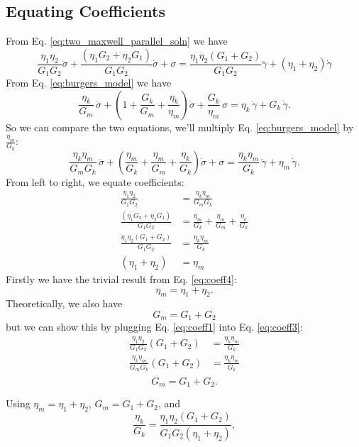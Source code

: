 \documentclass[12pt, a4paper]{article}
\numberwithin{equation}{section}
\begin{document}
\subsection{Equating Coefficients}
From Eq. \ref{eq:two_maxwell_parallel_soln} we have
\[
	\frac{\eta_1\eta_2}{G_1G_2} \ddot\sigma
	+ \frac{(\eta_1 G_2 + \eta_2 G_1)}{G_1G_2} \dot\sigma
	+ \sigma
		= \frac{\eta_1\eta_2(G_1 + G_2)}{G_1G_2} \ddot\gamma
			    + (\eta_1 + \eta_2)\dot\gamma
\]
From Eq. \ref{eq:burgers_model} we have
\[
	\frac{\eta_k}{G_m}\,\ddot\sigma
	+ \left(1 + \frac{G_k}{G_m} + \frac{\eta_k}{\eta_m}\right)\dot\sigma
	+ \frac{G_k}{\eta_m}\,\sigma
	= \eta_k\,\ddot\gamma + G_k\,\dot\gamma.
\]
So we can compare the two equations, we'll multiply Eq. \ref{eq:burgers_model} by $\frac{\eta_m}{G_k}$:
\[
	\frac{\eta_k \eta_m}{G_m G_k}\,\ddot\sigma
	+ \left(\frac{\eta_m}{G_k} + \frac{\eta_m}{G_m} + \frac{\eta_k}{G_k}\right)\dot\sigma
	+ \sigma
	= \frac{\eta_k \eta_m}{G_k}\,\ddot\gamma + \eta_m\,\dot\gamma.
\]
From left to right, we equate coefficients:
\begin{align}
	\frac{\eta_1\eta_2}{G_1G_2}
	&= \frac{\eta_k \eta_m}{G_m G_k} \label{eq:coeff1} \\
	\frac{(\eta_1 G_2 + \eta_2 G_1)}{G_1G_2}
	&= \frac{\eta_m}{G_k} + \frac{\eta_m}{G_m} + \frac{\eta_k}{G_k} \label{eq:coeff2} \\
	\frac{\eta_1\eta_2(G_1 + G_2)}{G_1G_2}
	&= \frac{\eta_k \eta_m}{G_k} \label{eq:coeff3} \\
	(\eta_1 + \eta_2)
	&= \eta_m \label{eq:coeff4}
\end{align}
Firstly we have the trivial result from Eq. \ref{eq:coeff4}:
\begin{equation*}
	\boxed{\eta_m = \eta_1 + \eta_2}.
\end{equation*}
Theoretically, we also have
\begin{equation*}
	G_m = G_1 + G_2
\end{equation*}
but we can show this by plugging Eq. \ref{eq:coeff1} into Eq. \ref{eq:coeff3}:
\begin{align*}
	\frac{\eta_1\eta_2}{G_1G_2}(G_1 + G_2)
	&= \frac{\eta_k \eta_m}{G_k} \\
	\frac{\eta_k \eta_m}{G_m G_k}(G_1 + G_2)
	&= \frac{\eta_k \eta_m}{G_k} \\
\end{align*}
\begin{equation*}
	\boxed{G_m = G_1 + G_2}.
\end{equation*}

Using $\eta_m=\eta_1+\eta_2$, $G_m=G_1+G_2$, and
\[
	\frac{\eta_k}{G_k}
	=
	\frac{\eta_1\eta_2(G_1+G_2)}{G_1G_2(\eta_1+\eta_2)},
\]
\end{document}
